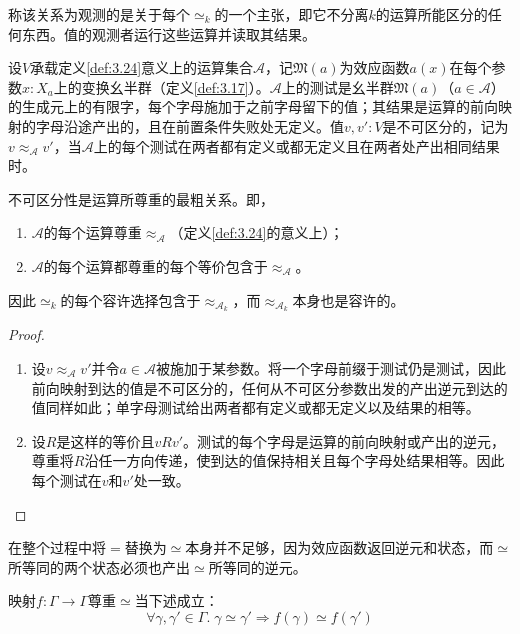 称该关系为观测的是关于每个$\simeq_k$的一个主张，即它不分离$k$的运算所能区分的任何东西。值的观测者运行这些运算并读取其结果。

\begin{definition}\label{def:3.34}
设$V$承载定义\ref{def:3.24}意义上的运算集合$\mathcal{A}$，记$\mathfrak{M}(a)$为效应函数$a(x)$在每个参数$x: X_a$上的变换幺半群（定义\ref{def:3.17}）。$\mathcal{A}$上的测试是幺半群$\mathfrak{M}(a)$（$a \in \mathcal{A}$）的生成元上的有限字，每个字母施加于之前字母留下的值；其结果是运算的前向映射的字母沿途产出的，且在前置条件失败处无定义。值$v, v': V$是不可区分的，记为$v \approx_{\mathcal{A}} v'$，当$\mathcal{A}$上的每个测试在两者都有定义或都无定义且在两者处产出相同结果时。
\end{definition}

\begin{lemma}\label{lem:3.35}
不可区分性是运算所尊重的最粗关系。即，
\begin{enumerate}
\item $\mathcal{A}$的每个运算尊重$\approx_{\mathcal{A}}$（定义\ref{def:3.24}的意义上）；
\item $\mathcal{A}$的每个运算都尊重的每个等价包含于$\approx_{\mathcal{A}}$。
\end{enumerate}

因此$\simeq_k$的每个容许选择包含于$\approx_{\mathcal{A}_k}$，而$\approx_{\mathcal{A}_k}$本身也是容许的。
\end{lemma}

\begin{proof}
\begin{enumerate}
\item 设$v \approx_{\mathcal{A}} v'$并令$a \in \mathcal{A}$被施加于某参数。将一个字母前缀于测试仍是测试，因此前向映射到达的值是不可区分的，任何从不可区分参数出发的产出逆元到达的值同样如此；单字母测试给出两者都有定义或都无定义以及结果的相等。
\item 设$R$是这样的等价且$vRv'$。测试的每个字母是运算的前向映射或产出的逆元，尊重将$R$沿任一方向传递，使到达的值保持相关且每个字母处结果相等。因此每个测试在$v$和$v'$处一致。
\end{enumerate}
\end{proof}

在整个过程中将$=$替换为$\simeq$本身并不足够，因为效应函数返回逆元和状态，而$\simeq$所等同的两个状态必须也产出$\simeq$所等同的逆元。

\begin{definition}\label{def:3.36}
映射$f: \Gamma \to \Gamma$尊重$\simeq$当下述成立：
\begin{equation}\label{eq:3.33}
\forall \gamma, \gamma' \in \Gamma.\; \gamma \simeq \gamma' \Rightarrow f(\gamma) \simeq f(\gamma')
\end{equation}
\end{definition}


